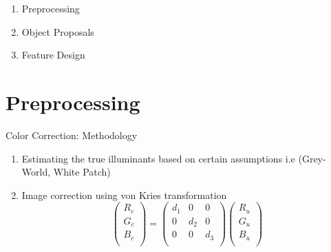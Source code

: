 \documentclass[14pt]{beamer}
\begin{document}
\begin{frame}[standout]{}
  \begin{enumerate}
    \item Preprocessing
    \item Object Proposals
    \item Feature Design
  \end{enumerate}
\end{frame}

\section{Preprocessing}

\begin{frame}{Color Correction: Methodology}
  \begin{enumerate}
    \item Estimating the true illuminants based on certain assumptions i.e
      (Grey-World, White Patch)
    \item Image correction using von Kries transformation
      \[
      \begin{pmatrix}
        R_c \\
        G_c \\
        B_c \\
      \end{pmatrix}
      =
      \begin{pmatrix}
        d_1 & 0 & 0 \\
        0 & d_2 & 0 \\
        0 & 0 & d_3\\
      \end{pmatrix}
      \begin{pmatrix}
        R_u \\
        G_u \\
        B_u \\
      \end{pmatrix}
      \]
  \end{enumerate}
\end{frame}
\end{document}

